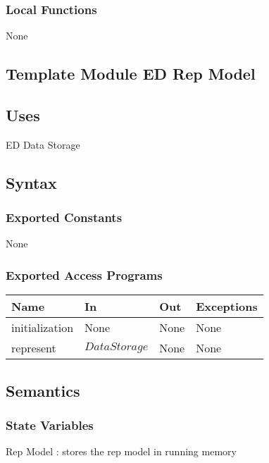 \documentclass[12pt, titlepage]{article}
\begin{document}
\subsubsection{Local Functions}

None


\subsection{Template Module ED Rep Model}

\subsection{Uses}

ED Data Storage

\subsection{Syntax}

\subsubsection{Exported Constants}

None

\subsubsection{Exported Access Programs}

\begin{center}
\begin{tabular}{p{3cm} p{4cm} p{4cm} p{3cm}}
\hline
\textbf{Name} & \textbf{In} & \textbf{Out} & \textbf{Exceptions} \\
\hline
initialization & None & None & None \\
represent & $DataStorage$ & None & None \\
\hline
\end{tabular}
\end{center}

\subsection{Semantics}

\subsubsection{State Variables}

Rep Model : stores the rep model in running memory
\end{document}
